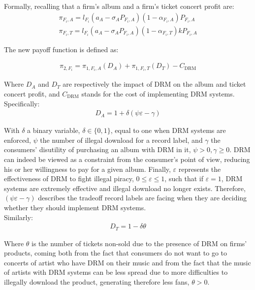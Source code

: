 \documentclass[a4paper,12pt]{article}
\numberwithin{equation}{section}
\newcommand{\drm}{\text{DRM}}
\newcommand{\firmpayoff}[2]{\pi_{{#1}, F_{#2}}}
\newcommand{\firmalbum}[2]{\pi_{#1, F_{#2}, A}}
\newcommand{\firmticket}[2]{\pi_{#1, F_{#2}, T}}
\newcommand{\drminf}{(\psi \varepsilon - \gamma)}
\begin{document}
Formally, recalling that a firm’s album and a firm’s ticket concert profit are:
\begin{eqnarray}
\pi_{F_i, A} = l_{F_i} (a_A - \sigma_A P_{F_i, A})(1 - \alpha_{F_i, A}) P_{F_i, A}\\
\pi_{F_i, T} = l_{F_i} (a_A - \sigma_A P_{F_i, A})(1 - \alpha_{F_i, T}) k P_{F_i, A}
\end{eqnarray}

The new payoff function is defined as:

\begin{eqnarray}
\firmpayoff{2}{i} = \firmalbum{1}{i} (D_A) + \firmticket{1}{i}  (D_T) - C_{\drm}
\label{Eq:FirmTotalPayoffDRM}
\end{eqnarray}

Where $D_A$ and $D_T$ are respectively the impact of DRM on the album and ticket concert profit, and $C_{\drm}$ stands for the cost of implementing DRM systems. Specifically:
\begin{eqnarray}
D_A = 1 + \delta \drminf
\label{Eq:DA}
\end{eqnarray}

With $\delta$ a binary variable, $\delta \in \{0, 1\}$, equal to one when DRM systems are enforced, $\psi$ the number of illegal download for a record label, and $\gamma$ the consumers’ disutility of purchasing an album with DRM in it, $\psi > 0, \gamma \geq 0$. DRM can indeed be viewed as a constraint from the consumer’s point of view, reducing his or her willingness to pay for a given album. Finally, $\varepsilon$ represents the effectiveness of DRM to fight illegal piracy, $0 \leq \varepsilon \leq 1$, such that if $\varepsilon = 1$, DRM systems are extremely effective and illegal download no longer exists. Therefore, $\drminf$ describes the tradeoff record labels are facing when they are deciding whether they should implement DRM systems.\\

Similarly:
\begin{eqnarray}
D_T = 1 - \delta \theta
\label{Eq:DT}
\end{eqnarray}

Where $\theta$ is the number of tickets non-sold due to the presence of DRM on firms’ products, coming both from the fact that consumers do not want to go to concerts of artist who have DRM on their music and from the fact that the music of artists with DRM systems can be less spread due to more difficulties to illegally download the product, generating therefore less fans, $\theta > 0$.\\
\end{document}
